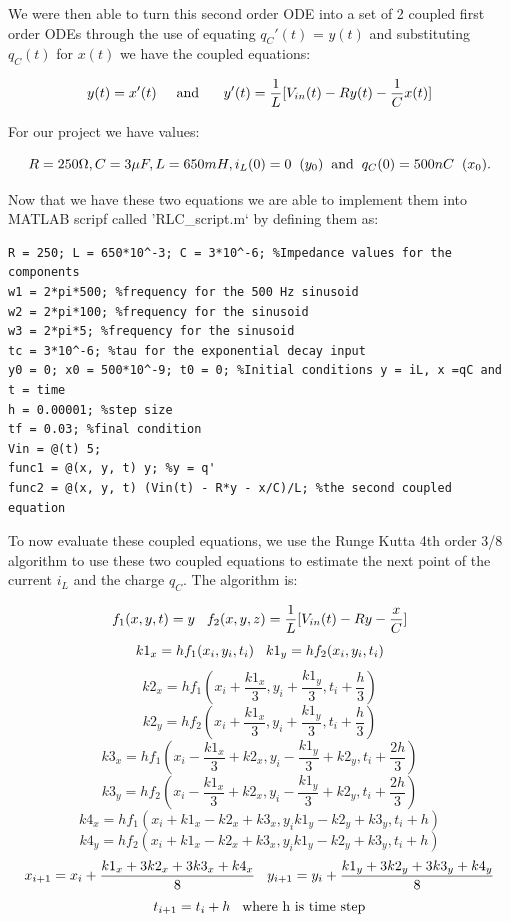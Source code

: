 \documentclass[10pt,a4paper]{article}
\begin{document}
We were then able to turn this second order ODE into a set of 2 coupled first order ODEs through the use of equating $q_C'(t)$ = $y(t)$ and substituting $q_C(t)$ for $x(t)$ we have the coupled equations:

\[y(t) = x'(t) \text{\hspace{5mm}and \hspace{5mm}}y'(t) = \frac{1}{L}[V_{in}(t)  - Ry(t) - \frac{1}{C}x(t)] \]

For our project we have values:

\[R = 250 \Omega, C = 3 \mu F , L = 650 mH, i_L(0) = 0 \hspace{2mm} (y_0) \text{\hspace{2mm}and\hspace{2mm}} q_C(0) = 500nC \hspace{2mm} (x_0).\]

Now that we have these two equations we are able to implement them into MATLAB scripf called 'RLC\_script.m` by defining them as:

\begin{verbatim}
R = 250; L = 650*10^-3; C = 3*10^-6; %Impedance values for the components
w1 = 2*pi*500; %frequency for the 500 Hz sinusoid
w2 = 2*pi*100; %frequency for the sinusoid
w3 = 2*pi*5; %frequency for the sinusoid
tc = 3*10^-6; %tau for the exponential decay input
y0 = 0; x0 = 500*10^-9; t0 = 0; %Initial conditions y = iL, x =qC and t = time
h = 0.00001; %step size
tf = 0.03; %final condition
Vin = @(t) 5;
func1 = @(x, y, t) y; %y = q'
func2 = @(x, y, t) (Vin(t) - R*y - x/C)/L; %the second coupled equation
\end{verbatim}

To now evaluate these coupled equations, we use the Runge Kutta 4th order 3/8 algorithm to use these two coupled equations to estimate the next point of the current $i_L$ and the charge $q_C$. The algorithm is:

\[f_1(x,y,t) = y \hspace{3mm} f_2(x,y,z) = \frac{1}{L}[V_{in}(t) - Ry - \frac{x}{C}]\]
\[k1_x = hf_1(x_i,y_i,t_i) \hspace{3mm} k1_y = hf_2(x_i,y_i,t_i)\]
\[k2_x = hf_1(x_i+\frac{k1_x}{3},y_i+\frac{k1_y}{3},t_i+\frac{h}{3}) \]
\[k2_y = hf_2(x_i+\frac{k1_x}{3},y_i+\frac{k1_y}{3},t_i+\frac{h}{3})\]
\[k3_x = hf_1(x_i-\frac{k1_x}{3}+k2_x,y_i-\frac{k1_y}{3}+k2_y,t_i+\frac{2h}{3}) \]
\[k3_y = hf_2(x_i-\frac{k1_x}{3}+k2_x,y_i-\frac{k1_y}{3}+k2_y,t_i+\frac{2h}{3})\]
\[k4_x = hf_1(x_i+k1_x-k2_x+k3_x,y_ik1_y-k2_y+k3_y,t_i+h) \]
\[k4_y = hf_2(x_i+k1_x-k2_x+k3_x,y_ik1_y-k2_y+k3_y,t_i+h)\]
\[x_{i+1} =x_i+\frac{k1_x+3k2_x+3k3_x+k4_x}{8} \hspace{3mm} y_{i+1} =y_i+\frac{k1_y+3k2_y+3k3_y+k4_y}{8}\]
\[t_{i+1} = t_i + h \hspace{3mm} \text{where h is time step}\]
\end{document}
